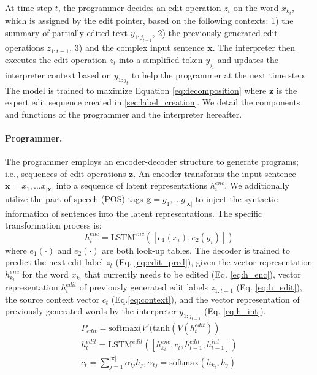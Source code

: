 \documentclass[11pt,a4paper]{article}
\begin{document}
\noindent At time step $t$, the programmer decides an edit operation $z_t$ on the word $x_{k_t}$, which is assigned by the edit pointer,  based on the following contexts:  1) the summary of partially edited text $y_{1:j_{t-1}}$, 2) the previously generated edit operations $z_{1:t-1}$, 3) and the complex input sentence $\mathbf{x}$. The interpreter then executes the edit operation $z_t$ into a simplified token $y_{j_t}$ and updates the interpreter context based on $y_{1:j_{t}}$ to help the programmer at the next time step. The model is trained to maximize Equation \ref{eq:decomposition} where $\mathbf{z}$ is the expert edit sequence created in \ref{sec:label_creation}.  We detail the components and functions of the programmer and the interpreter hereafter.
  
\paragraph{Programmer.} The programmer employs an encoder-decoder structure to generate programs; i.e., sequences of edit operations $\mathbf{z}$. An encoder transforms the input sentence $\mathbf{x}=x_1,\ldots x_{|\mathbf{x}|}$ into a sequence of latent representations $h_i^{enc}$. We additionally utilize the part-of-speech (POS) tags $\mathbf{g}=g_1,\ldots g_{|\mathbf{x}|}$ to inject the syntactic information of sentences into the latent representations. The specific transformation process is:  
\begin{equation} \label{eq:h_enc}
    h^{enc}_i=\text{LSTM}^{enc}([e_1(x_i),e_2(g_i)])
\end{equation}
where $e_1(\cdot)$ and $e_2(\cdot)$ are both look-up tables.
The  decoder  is  trained  to  predict  the  next  edit label $z_t$ (Eq. \ref{eq:edit_pred}), given the vector representation $h^{enc}_{k_t}$  for the word $x_{k_t}$ that currently needs to be edited (Eq. \ref{eq:h_enc}), vector representation  $h^{\textit{edit}}_t$ of previously generated edit labels $z_{1:t-1}$ (Eq. \ref{eq:h_edit}), the  source context  vector $c_t$  (Eq.\ref{eq:context}), and the vector representation of previously generated words by the interpreter $y_{1:j_{t-1}}$ (Eq. \ref{eq:h_int}). 
\begin{align}
     P_{\textit{edit}}=\text{softmax}(V'(\text{tanh}(V(h^{\textit{edit}}_t)) \label{eq:edit_pred}\\
      h^{\textit{edit}}_t=\text{LSTM}^{\textit{edit}} ([h^{\textit{enc}}_{k_t},c_t,h^{\textit{edit}}_{t-1},h^{\textit{int}}_{t-1}]) \label{eq:h_edit} \\ 
     c_{t}=\sum_{j=1}^{|\mathbf{x}|}\alpha_{tj}h_j, \alpha_{tj}=\text{softmax}(h_{k_t},h_j) \label{eq:context}
\end{align}
\end{document}
